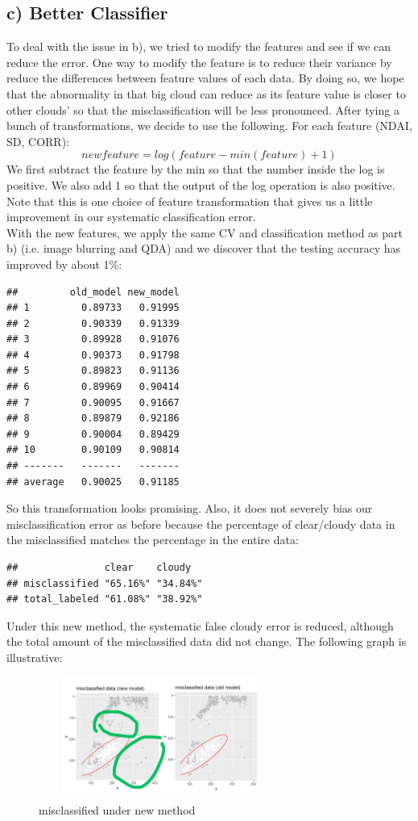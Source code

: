 \documentclass[jou]{apa}%
\begin{document}
\subsection{c) Better Classifier}
To deal with the issue in b), we tried to modify the features and see if we can reduce the error. One way to modify the feature is to reduce their variance by reduce the differences between feature values of each data. By doing so, we hope that the abnormality in that big cloud can reduce as its feature value is closer to other clouds' so that the misclassification will be less pronounced. After tying a bunch of transformations, we decide to use the following. For each feature (NDAI, SD, CORR):
$$newfeature = log(feature - min(feature) + 1)$$
We first subtract the feature by the min so that the number inside the log is positive. We also add 1 so that the output of the log operation is also positive. Note that this is one choice of feature transformation that gives us a little improvement in our systematic classification error.\\
With the new features, we apply the same CV and classification method as part b) (i.e. image blurring and QDA) and we discover that the testing accuracy has improved by about 1\%:
\begin{verbatim}
##         old_model new_model
## 1         0.89733   0.91995
## 2         0.90339   0.91339
## 3         0.89928   0.91076
## 4         0.90373   0.91798
## 5         0.89823   0.91136
## 6         0.89969   0.90414
## 7         0.90095   0.91667
## 8         0.89879   0.92186
## 9         0.90004   0.89429
## 10        0.90109   0.90814
## -------   -------   -------
## average   0.90025   0.91185
\end{verbatim}
So this transformation looks promising. Also, it does not severely bias our misclassification error as before because the percentage of clear/cloudy data in the misclassified matches the percentage in the entire data:
\begin{verbatim}
##               clear    cloudy  
## misclassified "65.16%" "34.84%"
## total_labeled "61.08%" "38.92%"
\end{verbatim}
Under this new method, the systematic false cloudy error is reduced, although the total amount of the misclassified data did not change. The following graph is illustrative:
\begin{figure}[H]\hspace*{-2cm}\centering\includegraphics[width=8cm, height = 4cm]{newmis}\hspace*{-0.8cm}\caption{misclassified under new method}\end{figure}
\end{document}

